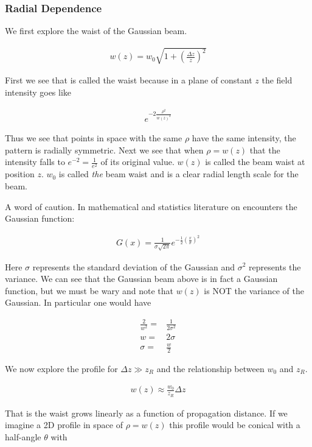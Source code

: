 \documentclass[12pt]{article}
\begin{document}
\subsubsection{Radial Dependence}
We first explore the waist of the Gaussian beam.

\begin{align}
w(z) = w_0 \sqrt{1+\left(\frac{\Delta z}{z}\right)^2}
\end{align}

First we see that is called the waist because in a plane of constant $z$ the field intensity goes like

\begin{align}
e^{-2 \frac{\rho^2}{w(z)^2}}
\end{align}

Thus we see that points in space with the same $\rho$ have the same intensity, the pattern is radially symmetric.
Next we see that when $\rho = w(z)$ that the intensity falls to $e^{-2} = \frac{1}{e^2}$ of its original value.
$w(z)$ is called the beam waist at position $z$.
$w_0$ is called \textit{the} beam waist and is a clear radial length scale for the beam.

A word of caution. 
In mathematical and statistics literature on encounters the Gaussian function:

\begin{align}
G(x) = \frac{1}{\sigma \sqrt{2\pi}} e^{-\frac{1}{2} \left(\frac{x}{\sigma}\right)^2}
\end{align}

Here $\sigma$ represents the standard deviation of the Gaussian and $\sigma^2$ represents the variance. 
We can see that the Gaussian beam above is in fact a Gaussian function, but we must be wary and note that $w(z)$ is NOT the variance of the Gaussian. In particular one would have

\begin{align}
\frac{2}{w^2} =& \frac{1}{2\sigma^2}\\
w =& 2\sigma\\
\sigma =& \frac{w}{2}
\end{align}

We now explore the profile for $\Delta z \gg z_R$ and the relationship between $w_0$ and $z_R$.

\begin{align}
w(z) \approx \frac{w_0}{z_R} \Delta z
\end{align}

That is the waist grows linearly as a function of propagation distance.
If we imagine a 2D profile in space of $\rho = w(z)$ this profile would be conical with a half-angle $\theta$ with
\end{document}
